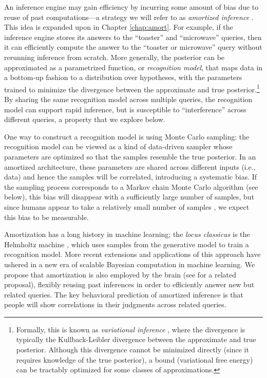 An inference engine may gain efficiency by incurring some amount of bias due to reuse of past computations---a strategy we will refer to as \emph{amortized inference} \citep{stuhlmuller2013learning, gershman2014amortized}. This idea is expanded upon in Chapter \ref{chap:amort}. For example, if the inference engine stores its answers to the ``toaster'' and ``microwave'' queries, then it can efficiently compute the answer to the ``toaster or microwave'' query without rerunning inference from scratch. More generally, the posterior can be approximated as a parametrized function, or \emph{recognition model}, that maps data in a bottom-up fashion to a distribution over hypotheses, with the parameters trained to minimize the divergence between the approximate and true posterior.\footnote{Formally, this is known as \emph{variational inference} \citep{jordan1999introduction}, where the divergence is typically the Kullback-Leibler divergence between the approximate and true posterior. Although this divergence cannot be minimized directly (since it requires knowledge of the true posterior), a bound (variational free energy) can be tractably optimized for some classes of approximations.} By sharing the same recognition model across multiple queries, the recognition model can support rapid inference, but is susceptible to ``interference'' across different queries, a property that we explore below.

One way to construct a recognition model is using Monte Carlo sampling: the recognition model can be viewed as a kind of data-driven sampler whose parameters are optimized so that the samples resemble the true posterior. In an amortized architecture, these parameters are shared across different inputs (i.e., data) and hence the samples will be correlated, introducing a systematic bias. If the sampling process corresponds to a Markov chain Monte Carlo algorithm (see below), this bias will disappear with a sufficiently large number of samples, but since humans appear to take a relatively small number of samples \citep{dasgupta17,vul2014one}, we expect this bias to be measurable.

Amortization has a long history in machine learning; the \emph{locus classicus} is the Helmholtz machine \citep{dayan1995helmholtz,hinton1995wake}, which uses samples from the generative model to train a recognition model. More recent extensions and applications of this approach \citep{rezende2014stochastic,paige2016inference,kingma2013auto,ritchie2016neurally} have ushered in a new era of scalable Bayesian computation in machine learning. We propose that amortization is also employed by the brain (see \citet{yildirim2015efficient} for a related proposal), flexibly reusing past inferences in order to efficiently answer new but related queries. The key behavioral prediction of amortized inference is that people will show correlations in their judgments across related queries. 

